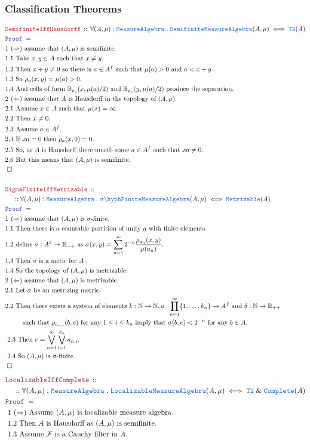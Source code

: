 \documentclass[12pt]{scrartcl}
\newcommand{\TYPE}[1]{\textcolor{NavyBlue}{\mathtt{#1}}}
\newcommand{\LOGIC}[1]{\textcolor{Blue}{\mathtt{#1}}}
\newcommand{\THM}[1]{\textcolor{Maroon}{\mathtt{#1}}}
\renewcommand{\.}{\; . \;}
\newcommand{\Theorem}[2]{& \THM{#1} \, :: \, #2 \\ & \Proof = \\ }
\newcommand{\NewLine}{\\ & \kern 1pc}
\newcommand{\Page}[1]{ \begin{align*} #1 \end{align*}   }
\renewcommand{\And}{\; \& \;}
\newcommand{\Reals}{\mathbb{R} }
\newcommand{\Nat}{\mathbb{N} }
\newcommand{\QED}{\; \square}
\newcommand{\EndProof}{& \QED \\}
\newcommand{\Proof}{\LOGIC{Proof} \; }
\newcommand{\Explain}[1]{& \text{#1.} \\}
\newcommand{\ExplainFurther}[1]{& \text{#1} \\}
\newcommand{\Cell}{\mathbb{B}}
\newcommand{\sFinite}{\TYPE{\sigma \hyph  Finite}}
\newcommand{\Semifinite}{\TYPE{Semifinite}}
\newcommand{\Loc}{\TYPE{Localizable}}
\newcommand{\F}{\mathcal{F}}
\newcommand{\MA}{\TYPE{MeasureAlgebra}}
\begin{document}
\subsubsection{Classification Theorems}
\Page{
	\Theorem{SemifiniteIffHausdorff}
	{
		\forall (A,\mu) : \MA \.
		\Semifinite\MA(A,\mu) \iff \TYPE{T2}(A)
	}
	\Explain{1 $(\Rightarrow)$ assume that $(A,\mu)$ is semifinite}
	\Explain{1.1 Take $x,y \in A$ such that $x \neq y$}
	\Explain{1.2 Then  $x +  y \neq 0$ so there is $a \in A^f$ such that $\mu(a) > 0$ and $a < x + y$ }
	\Explain{1.3 So $\rho_a(x,y) = \mu(a) > 0$}
	\Explain{1.4 And cells of form $\Cell_{\rho_a}(x,\mu(a)/2)$ and $\Cell_{\rho_a}(y,\mu(a)/2)$
		produce the separation}
    \Explain{2 $(\Leftarrow)$ assume that $A$ is Hausdorff in the topology of $(A,\mu)$}
    \Explain{2.1 Assume $x \in A$ such that $\mu(x) = \infty$}
    \Explain{2.2 Then $x \neq 0$}
    \Explain{2.3 Assume $a \in A^f$}
    \Explain{2.4 If $xa = 0$ then $\rho_a(x,0) = 0$}
    \Explain{2.5 So, as $A$ is Hausdorff there mustb some $a \in A^f$ such that $xa \neq 0$}
    \Explain{2.6 But this means that $(A,\mu)$ is semifinite}
    \EndProof
    \\
    \Theorem{SigmaFiniteIffMetrizable}
	{
		\NewLine ::		
		\forall (A,\mu) : \MA \.
		\sFinite\MA(A,\mu) \iff \TYPE{Metrizable}(A)
	}
	\Explain{1 $(\Rightarrow)$ assume that $(A,\mu)$ is $\sigma$-finite}
	\Explain{1.1 Then there is a countable partition of unity $a$ with finite elements}
	\Explain{1.2 define $\sigma : A^2 \to \Reals_{++}$ as 
		$\sigma(x,y) = \sum^\infty_{n=1} 2^{-n} \frac{\rho_{a_n}(x,y)}{\mu(a_n)}$}
	\Explain{1.3 Then $\sigma$ is a metic for $A$ }
	\Explain{1.4 So the topology of $(A,\mu)$ is metrizable}  
	\Explain{2 $(\Leftarrow)$ assume that $(A,\mu)$ is metrizable}
	\Explain{2.1 Let $\sigma$ be an metrizing metric}
	\ExplainFurther{2.2 Then there exists a system of elements 
		$k : \Nat \to \Nat, a : \prod^\infty_{n=1} \{1,\ldots,k_n\} \to A^f$ and 
		$\delta : \Nat \to \Reals_{++}$ }
	\Explain{ $\quad \quad$ such that  $\rho_{a_{n,i}}(b,e)$ 
		for any $1 \le i \le k_n$ imply that $\sigma(b,e) < 2^{-n}$ for any $b \in A$}
	\Explain{ 2.3 Then $e = \bigvee^\infty_{n=1} \bigvee^{k_n}_{i=1} a_{n,i}$}
	\Explain{ 2.4 So $(A,\mu)$ is $\sigma$-finite} 
    \EndProof
 }\Page{
    \Theorem{LocalizableIffComplete}
	{
		\NewLine ::		
		\forall (A,\mu) : \MA \.
		\Loc\MA(A,\mu) \iff \TYPE{T2}\And \TYPE{Complete}(A)
	}
	\Explain{ 1 $(\Rightarrow)$ Assume $(A,\mu)$ is localizable measure algebra}
	\Explain{ 1.2 Then $A$ is Hausdorff as $(A,\mu)$ is semifinite}
	\Explain{ 1.3  Assume $\F$ is a Cauchy filter in $A$}
}
\end{document}

